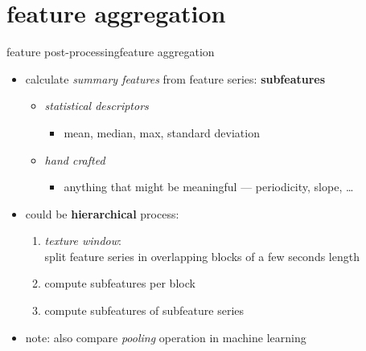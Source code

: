     \section[aggregation]{feature aggregation}
		\begin{frame}{feature post-processing}{feature aggregation}
            \begin{itemize}
                \item calculate \textit{summary features} from feature series: \textbf{subfeatures}
                            \begin{itemize}
                                \item   \textit{statistical descriptors}
                                    \begin{itemize}
                                        \item   mean, median, max, standard deviation
                                    \end{itemize}
                                        
                                \item   \textit{hand crafted }
                                    \begin{itemize}
                                        \item anything that might be meaningful --- periodicity, slope, \ldots
                                    \end{itemize}
                    \end{itemize}
                \bigskip
                \item<3->   could be \textbf{hierarchical} process:
                    \begin{enumerate}
                        \item   \textit{texture window}:\\ split feature series in overlapping blocks of a few seconds length
                        \item   compute subfeatures per block
                        \item   compute subfeatures of subfeature series
                    \end{enumerate}
                \bigskip
                \item<4->   note: also compare \textit{pooling} operation in machine learning
            \end{itemize}
		\end{frame}

